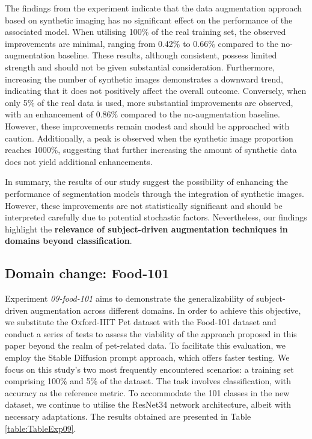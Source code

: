 The findings from the experiment indicate that the data augmentation approach based on synthetic imaging has no significant effect on the performance of the associated model. When utilising 100\% of the real training set, the observed improvements are minimal, ranging from 0.42\% to 0.66\% compared to the no-augmentation baseline. These results, although consistent, possess limited strength and should not be given substantial consideration. Furthermore, increasing the number of synthetic images demonstrates a downward trend, indicating that it does not positively affect the overall outcome. Conversely, when only 5\% of the real data is used, more substantial improvements are observed, with an enhancement of 0.86\% compared to the no-augmentation baseline. However, these improvements remain modest and should be approached with caution. Additionally, a peak is observed when the synthetic image proportion reaches 1000\%, suggesting that further increasing the amount of synthetic data does not yield additional enhancements.

In summary, the results of our study suggest the possibility of enhancing the performance of segmentation models through the integration of synthetic images. However, these improvements are not statistically significant and should be interpreted carefully due to potential stochastic factors. Nevertheless, our findings highlight the \textbf{relevance of subject-driven augmentation techniques in domains beyond classification}.

\subsection{Domain change: Food-101} \label{sec: exp-09}

Experiment \textit{09-food-101} aims to demonstrate the generalizability of subject-driven augmentation across different domains. In order to achieve this objective, we substitute the Oxford-IIIT Pet dataset with the Food-101 dataset and conduct a series of tests to assess the viability of the approach proposed in this paper beyond the realm of pet-related data. To facilitate this evaluation, we employ the Stable Diffusion prompt approach, which offers faster testing. We focus on this study's two most frequently encountered scenarios: a training set comprising 100\% and 5\% of the dataset. The task involves classification, with accuracy as the reference metric. To accommodate the 101 classes in the new dataset, we continue to utilise the ResNet34 network architecture, albeit with necessary adaptations. The results obtained are presented in Table \ref{table:TableExp09}.

